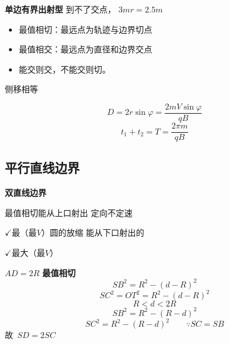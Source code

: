 \textbf{单边有界出射型}\quad {}\quad {}
到不了交点，
$3\unit{m}$\quad $r=2.5\unit{m}$
\begin{itemize}
\item 最值相切：最远点为轨迹与边界切点
\item 最值相交：最远点为直径和边界交点
\item 能交则交，不能交则切。
\end{itemize}


侧移相等

\[ D=2r\sin\varphi=\frac{2mV\sin\varphi}{qB} \]
\[ t_1+t_2=T=\frac{2\pi m}{qB} \]

\subsection{平行直线边界}
\textbf{双直线边界}

最值相切\quad 能从上口射出
定向不定速

$\checkmark$最（最$V$）\quad 圆的放缩
能从下口射出的

$\checkmark$最大（最$V$）

$AD=2R$
\textbf{最值相切}
\[ SB^2=R^2-(d-R)^2 \]
\[ SC^2=OT^2=R^2-(d-R)^2 \]
\[ R<d<2R \]
\[ SB^2=R^2-(R-d)^2 \]
\[ SC^2=R^2-(R-d)^2 \qquad \because SC=SB \]
故\ $SD=2SC$

